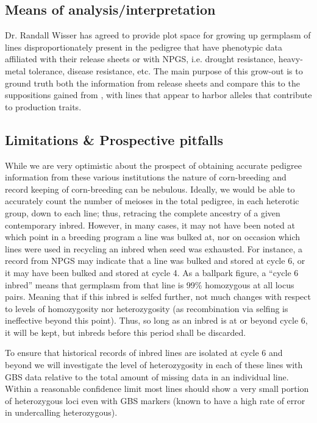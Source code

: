 \documentclass[12pt]{article}
\begin{document}

\subsection*{Means of analysis/interpretation}
Dr. Randall Wisser has agreed to provide plot space for growing up germplasm of lines disproportionately present in the pedigree that have phenotypic data affiliated with their release sheets or with NPGS, i.e. drought resistance, heavy-metal tolerance, disease resistance, etc. 
The main purpose of this grow-out is to ground truth both the information from release sheets and compare this to the suppositions gained from \citep{Berg:2014bs}, with lines that appear to harbor alleles that contribute to production traits.


\subsection*{Limitations \& Prospective pitfalls}
While we are very optimistic about the prospect of obtaining accurate pedigree information from these various institutions the nature of corn-breeding and record keeping of corn-breeding can be nebulous. 
Ideally, we would be able to accurately count the number of meioses in the total pedigree, in each heterotic group, down to each line; thus, retracing the complete ancestry of a given contemporary inbred. 
However, in many cases, it may not have been noted at which point in a breeding program a line was bulked at, nor on occasion which lines were used in recycling an inbred when seed was exhausted. 
For instance, a record from NPGS may indicate that a line was bulked and stored at cycle 6, or it may have been bulked and stored at cycle 4. As a ballpark figure, a ``cycle 6 inbred'' means that germplasm from that line is 99\% homozygous at all locus pairs. 
Meaning that if this inbred is selfed further, not much changes with respect to levels of homozygosity nor heterozygosity (as recombination via selfing is ineffective beyond this point).  
Thus, so long as an inbred is at or beyond cycle 6, it will be kept, but inbreds before this period shall be discarded.

To ensure that historical records of inbred lines are isolated at cycle 6 and beyond we will investigate the level of heterozygosity in each of these lines with GBS data relative to the total amount of missing data in an individual line. Within a reasonable confidence limit most lines should show a very small portion of heterozygous loci even with GBS markers (known to have a high rate of error in undercalling heterozygous). 
\end{document}
